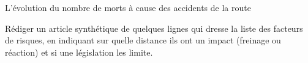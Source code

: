 \begin{doc}{L'évolution du nombre de morts à cause des accidents de la route}
  \centering
\end{doc}

\numeroQuestion
Rédiger un article synthétique de quelques lignes qui dresse la liste des facteurs de risques, en indiquant sur quelle distance ils ont un impact (freinage ou réaction) et si une législation les limite.